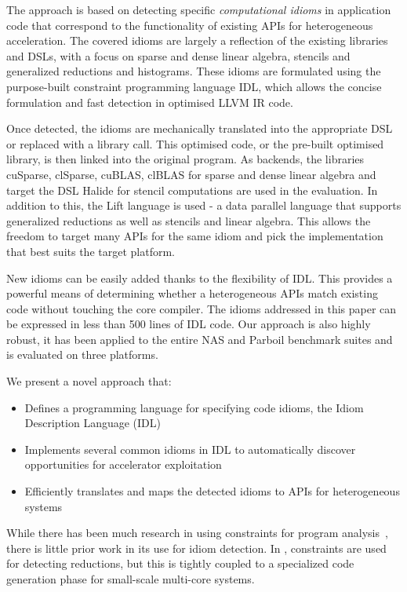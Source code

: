     The approach is based on detecting specific {\em computational idioms} in
    application code that correspond to the functionality of existing APIs for
    heterogeneous acceleration.
    The covered idioms are largely a reflection of the existing libraries and
    DSLs, with a focus on sparse and dense linear algebra, stencils and
    generalized reductions and histograms.
    These idioms are formulated using the purpose-built constraint programming
    language IDL, which allows the concise formulation and fast detection in
    optimised LLVM IR code.

    Once detected, the idioms are mechanically translated into the appropriate
    DSL or replaced with a library call.
    This optimised code, or the pre-built optimised library, is then linked into
    the original program.
    As backends, the libraries cuSparse, clSparse, cuBLAS, clBLAS for
    sparse and dense linear algebra and target the DSL Halide
    \cite{Ragan-Kelley2013Halide} for stencil computations are used in the
    evaluation.
    In addition to this, the Lift language \cite{SteuwerRD17} is used - a data
    parallel language that supports generalized reductions as well as stencils
    and linear algebra.
    This allows the freedom to target many APIs for the same idiom and pick the
    implementation that best suits the target platform.

    New idioms can be easily added thanks to the flexibility of IDL.
    This provides a powerful means of determining whether a heterogeneous
    APIs match existing code without touching the core compiler.
    The idioms addressed in this paper can be expressed in less than 500 lines
    of IDL code.
    Our approach is also highly robust, it has been applied to the entire NAS
    and Parboil benchmark suites and is evaluated on three platforms.

    We present a novel approach that:
    \begin{itemize}
    \item Defines a programming language for specifying code idioms, the Idiom
          Description Language (IDL)
    \item Implements several common idioms in IDL to automatically discover
     opportunities for accelerator exploitation
    \item Efficiently translates and maps the detected idioms to APIs for
          heterogeneous systems
    \end{itemize}

    While there has been much research in using constraints for program
    analysis~\cite{nielson2015principles}, there is little prior work in its use
    for idiom detection.
    In \cite{ginsbach2017discovery}, constraints are used for detecting
    reductions, but this is tightly coupled to a specialized code generation
    phase for small-scale multi-core systems.

